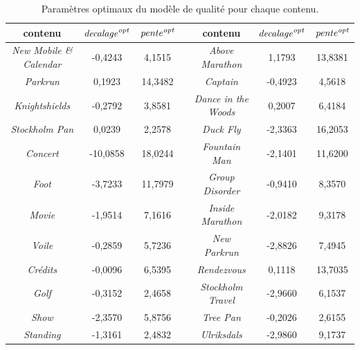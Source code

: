 \begin{table}[htbp]
\centering
\begin{tabular}{ccccccc}\toprule
\textbf{contenu}							& $\mathit{decalage}^{\textit{opt}}$	& $\mathit{pente}^{\textit{opt}}$	& & \textbf{contenu}						& $\mathit{decalage}^{\textit{opt}}$	& $\mathit{pente}^{\textit{opt}}$\\ \toprule
\multirow{2}{2.4cm}{\emph{New Mobile \& Calendar}}& \multirow{2}{1.1cm}{-0,4243}  	&  \multirow{2}{1.1cm}{4,1515} 	& & \multirow{2}{3cm}{\emph{Above Marathon}}			& \multirow{2}{1.1cm}{1,1793}   							& \multirow{2}{1.2cm}{13,8381} \\
& \\\midrule
\emph{Parkrun}					& 0,1923 		&  14,3482 	& & \emph{Captain}						& -0,4923  							& 4,5618 \\ \midrule
\emph{Knightshields}			& -0,2792  	&  3,8581 	& & \emph{Dance in the Woods}	& 0,2007   							& 6,4184\\ \midrule
\emph{Stockholm Pan}		& 0,0239  	&  2,2578 	& & \emph{Duck Fly}						& -2,3363  							& 16,2053\\ \midrule
\emph{Concert}					& -10,0858 	&  18,0244 	& & \emph{Fountain Man}				& -2,1401 							& 11,6200\\ \midrule
\emph{Foot}						& -3,7233 	&  11,7979 	& & \emph{Group Disorder}			& -0,9410    							& 8,3570\\ \midrule
\emph{Movie}						& -1,9514  	&  7,1616 	& & \emph{Inside Marathon}			& -2,0182    							& 9,3178\\ \midrule
\emph{Voile}						& -0,2859  	&  5,7236 	& & \emph{New Parkrun}				& -2,8826    							& 7,4945\\ \midrule
\emph{Crédits}					& -0,0096  	&  6,5395 	& & \emph{Rendezvous}					&  0,1118   							& 13,7035\\ \midrule
\emph{Golf}							& -0,3152  	&  2,4658 	& & \emph{Stockholm Travel}			& -2,9660    							& 6,1537\\ \midrule
\emph{Show}						& -2,3570  	&  5,8756 	& & \emph{Tree Pan}						& -0,2026    							& 2,6155\\\midrule
\emph{Standing}					& -1,3161  	&  2,4832 	& & \emph{Ulriksdals}						& -2,9860    							& 9,1737\\ \bottomrule
\end{tabular}
\caption{Paramètres optimaux du modèle de qualité pour chaque contenu.}
\label{tab:paramNomin}
\end{table}

